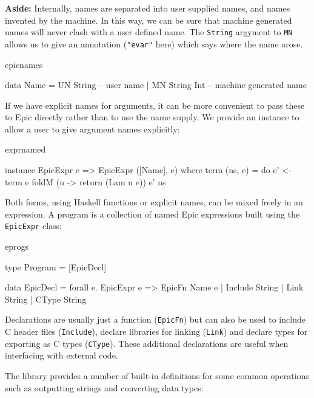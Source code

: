 \noindent
\textbf{Aside:}
Internally, names are separated into user supplied names, and names
invented by the machine. In this way, we can be sure that machine
generated names will never clash with a user defined name. The
\texttt{String} argyment to \texttt{MN} allows us to give an
annotation (\texttt{"evar"} here) which says where the name arose.

\begin{SaveVerbatim}{epicnames}

data Name = UN String     -- user name
          | MN String Int -- machine generated name

\end{SaveVerbatim}

\noindent
If we have explicit names for arguments, it can be more convenient to
pass these to Epic directly rather than to use the name supply. We
provide an instance to allow a user to give argument names explicitly:

\begin{SaveVerbatim}{exprnamed}

instance EpicExpr e => EpicExpr ([Name], e) where
    term (ns, e) = do 
        e' <- term e
        foldM (\e n -> return (Lam n e)) e' ns

\end{SaveVerbatim}

\noindent
Both forms, using Haskell functions or explicit names, can be mixed
freely in an expression. A program is a collection of named Epic
expressions built using the \texttt{EpicExpr} class:

\begin{SaveVerbatim}{eprogs}

type Program = [EpicDecl]

data EpicDecl = forall e. EpicExpr e => EpicFn Name e
              | Include String 
              | Link    String    
              | CType   String   

\end{SaveVerbatim}

\noindent
Declarations are usually just a function (\texttt{EpicFn}) but can
also be used to include C header files (\texttt{Include}), declare
libraries for linking (\texttt{Link}) and declare types for exporting
as C types (\texttt{CType}). These additional declarations are useful
when interfacing with external code.

The library provides a number of built-in definitions for some common
operations such as outputting strings and converting data types:

